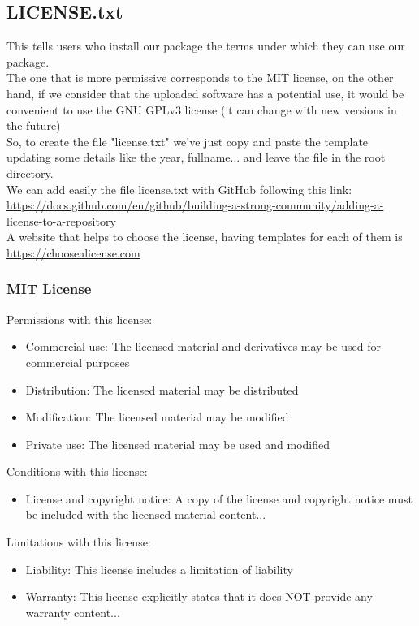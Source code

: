 \documentclass[a4paper]{article}
\begin{document}
		\subsection{LICENSE.txt}
			This tells users who install our package the terms under which they can use our package.\\ The one that is more permissive corresponds to the MIT license, on the other hand, if we consider that the uploaded software has a potential use, it would be convenient to use the GNU GPLv3 license (it can change with new versions in the future)\\
			So, to create the file "license.txt" we've just copy and paste the template updating some details like the year, fullname... and leave the file in the root directory.\\
			We can add easily the file license.txt with GitHub following this link: 
			\url{https://docs.github.com/en/github/building-a-strong-community/adding-a-license-to-a-repository}\\
			A website that helps to choose the license, having templates for each of them is \url{https://choosealicense.com} \\
			\subsubsection{MIT License}
				Permissions with this license:
				\begin{itemize}
					\item Commercial use: The licensed material and derivatives may be used for commercial purposes
					\item Distribution: The licensed material may be distributed
					\item Modification: The licensed material may be modified
					\item Private use: The licensed material may be used and modified
				\end{itemize}
				Conditions with this license:
				\begin{itemize}
					\item License and copyright notice: A copy of the license and copyright notice must be included with the licensed material
					content...
				\end{itemize}
				Limitations with this license:
				\begin{itemize}
					\item Liability: This license includes a limitation of liability
					\item Warranty: This license explicitly states that it does NOT provide any warranty
					content...
				\end{itemize}
				
\end{document}
